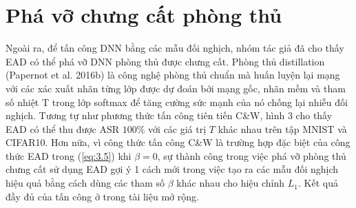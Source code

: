 \section{Phá vỡ chưng cất phòng thủ}
Ngoài ra, để tấn công DNN bằng các mẫu đối nghịch, nhóm tác giả đã cho thấy EAD có thể phá vỡ DNN phòng thủ được chưng cất. Phòng thủ distillation (Papernot et al. 2016b) là công nghệ phòng thủ chuẩn mà huấn luyện lại mạng với các xác xuất nhãn từng lớp được dự đoán bởi mạng gốc, nhãn mềm và tham số nhiệt T trong lớp softmax để tăng cường sức mạnh của nó chống lại nhiễu đối nghịch. Tương tự như phương thức tấn công tiên tiến C\&W, hình 3 cho thấy EAD có thể thu được ASR $100\%$ với các giá trị $T$ khác nhau trên tập MNIST và CIFAR10. Hơn nữa, vì công thức tấn công C\&W là trường hợp đặc biệt của công thức EAD trong (\ref{eq:3.5}) khi $\beta = 0$, sự thành công trong việc phá vỡ phòng thủ chưng cất sử dụng EAD gợi ý 1 cách mới trong việc tạo ra các mẫu đối nghịch hiệu quả bằng cách dùng các tham số  $\beta$ khác nhau cho hiệu chỉnh $L_1$. Kết quả đầy đủ của tấn công ở trong tài liệu mở rộng.